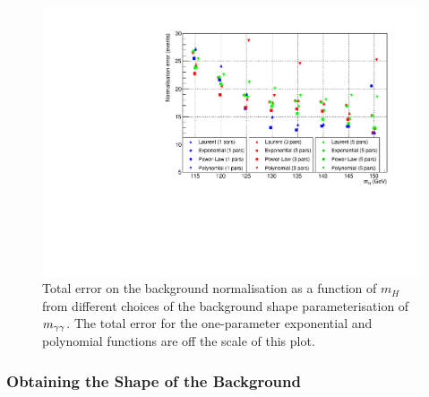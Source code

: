 \begin{figure}
 \begin{center}
  \includegraphics[width=.8\textwidth]{hgg7TeV/sidebandMvaPlots/fits/totalErrors}
 \end{center}
 \caption{Total error on the background normalisation as a function of $m_{H}$ from different choices of the 
background shape parameterisation of $m_{\gamma\gamma}$. The total error for the one-parameter exponential and polynomial functions are off the scale of this plot.}
 \label{fig:totalerrorallfunc}
\end{figure}


\subsubsection{Obtaining the Shape of the Background}
\label{sec:backgroundshape}


